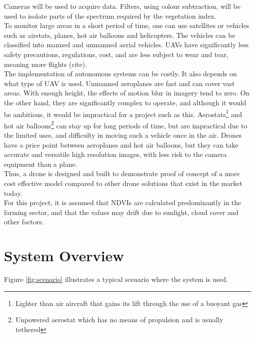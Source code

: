 Cameras will be used to acquire data. Filters, using colour subtraction, will be used to isolate parts of the spectrum required by the vegetation index.\\

To monitor large areas in a short period of time, one can use satellites or vehicles such as airstats, planes, hot air balloons and helicopters. The vehicles can be classified into manned and unmanned aerial vehicles. UAVs have significantly less safety precautions, regulations, cost, and are less subject to wear and tear, meaning more flights (cite).\\


The implementation of autonomous systems can be costly. It also depends on what type of UAV is used. Unmanned aeroplanes  are fast and can cover vast areas. With enough height, the effects of motion blur in imagery tend to zero. On the other hand, they are significantly complex to operate, and although it would be ambitious, it would be impractical for a project such as this. Aerostats\footnote{Lighter than air aircraft that gains its lift through the use of a buoyant gas} and hot air balloons\footnote{Unpowered aerostat which has no means of propulsion and is usually tethered} can stay up for long periods of time, but are impractical due to the limited uses, and difficulty in moving such a vehicle once in the air. Drones have a price point between aeroplanes and hot air balloons, but they can take accurate and versatile high resolution images, with less risk to the camera equipment than a plane.\\

Thus, a drone is designed and built to demonstrate proof of concept of a more cost effective model compared to other drone solutions that exist in the market today.\\

For this project, it is assumed that NDVIs are calculated predominantly in the farming sector, and that the values may drift due to sunlight, cloud cover and other factors.

\section{System Overview}

Figure \ref{fig:scenario} illustrates a typical scenario where the system is used.\\

